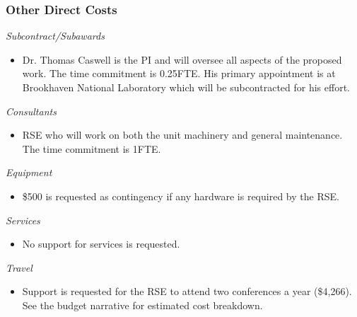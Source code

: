 \documentclass[12pt]{article}
\numberwithin{page}{section}
\begin{document}
\subsubsection{Other Direct Costs}
\textit{Subcontract/Subawards}
\begin{itemize}
\item Dr. Thomas Caswell is the PI and will oversee all aspects of the
  proposed work.  The time commitment is 0.25FTE.  His primary
  appointment is at Brookhaven National Laboratory which will be
  subcontracted for his effort.
\end{itemize}
\textit{Consultants}
\begin{itemize}
\item RSE who will work on both the unit machinery and general
  maintenance.  The time commitment is 1FTE.
\end{itemize}
\textit{Equipment}
\begin{itemize}
\item \$500 is requested as contingency if any hardware is required by the RSE.
\end{itemize}
\textit{Services}
\begin{itemize}
\item No support for services is requested.
\end{itemize}
\textit{Travel}
\begin{itemize}
\item Support is requested for the RSE to attend two conferences a
  year (\$4,266).  See the budget narrative for estimated cost
  breakdown.
\end{itemize}
\end{document}
